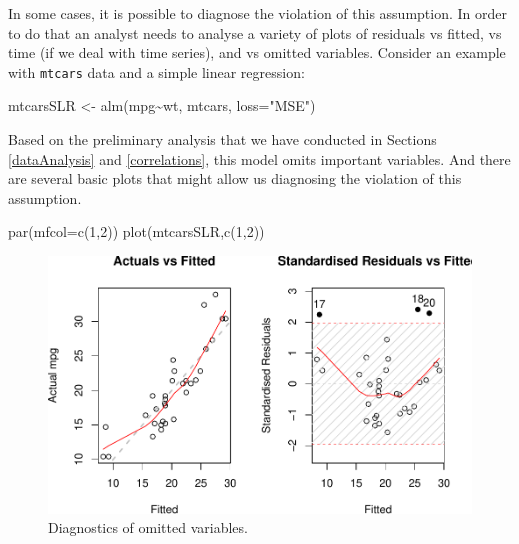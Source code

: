 \documentclass[
]{book}
\newenvironment{Shaded}{\begin{snugshade}}{\end{snugshade}}
\newcommand{\AttributeTok}[1]{\textcolor[rgb]{0.77,0.63,0.00}{#1}}
\newcommand{\DecValTok}[1]{\textcolor[rgb]{0.00,0.00,0.81}{#1}}
\newcommand{\FunctionTok}[1]{\textcolor[rgb]{0.00,0.00,0.00}{#1}}
\newcommand{\NormalTok}[1]{#1}
\newcommand{\OtherTok}[1]{\textcolor[rgb]{0.56,0.35,0.01}{#1}}
\newcommand{\SpecialCharTok}[1]{\textcolor[rgb]{0.00,0.00,0.00}{#1}}
\newcommand{\StringTok}[1]{\textcolor[rgb]{0.31,0.60,0.02}{#1}}
\theoremstyle{definition}
\theoremstyle{definition}
\theoremstyle{definition}
\theoremstyle{definition}
\theoremstyle{remark}
\begin{document}
In some cases, it is possible to diagnose the violation of this assumption. In order to do that an analyst needs to analyse a variety of plots of residuals vs fitted, vs time (if we deal with time series), and vs omitted variables. Consider an example with \texttt{mtcars} data and a simple linear regression:

\begin{Shaded}
\begin{Highlighting}[]
\NormalTok{mtcarsSLR }\OtherTok{\textless{}{-}} \FunctionTok{alm}\NormalTok{(mpg}\SpecialCharTok{\textasciitilde{}}\NormalTok{wt, mtcars, }\AttributeTok{loss=}\StringTok{"MSE"}\NormalTok{)}
\end{Highlighting}
\end{Shaded}

Based on the preliminary analysis that we have conducted in Sections \ref{dataAnalysis} and \ref{correlations}, this model omits important variables. And there are several basic plots that might allow us diagnosing the violation of this assumption.

\begin{Shaded}
\begin{Highlighting}[]
\FunctionTok{par}\NormalTok{(}\AttributeTok{mfcol=}\FunctionTok{c}\NormalTok{(}\DecValTok{1}\NormalTok{,}\DecValTok{2}\NormalTok{))}
\FunctionTok{plot}\NormalTok{(mtcarsSLR,}\FunctionTok{c}\NormalTok{(}\DecValTok{1}\NormalTok{,}\DecValTok{2}\NormalTok{))}
\end{Highlighting}
\end{Shaded}

\begin{figure}
\centering
\includegraphics{Svetunkov---Statistics-for-Business-Analytics_files/figure-latex/diagnostics01-1.pdf}
\caption{\label{fig:diagnostics01}Diagnostics of omitted variables.}
\end{figure}
\end{document}
